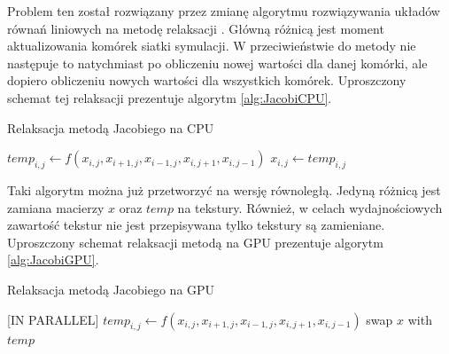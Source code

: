 Problem ten został rozwiązany przez zmianę algorytmu rozwiązywania układów
równań liniowych na metodę relaksacji . Główną różnicą jest moment
aktualizowania komórek siatki symulacji. W przeciwieństwie do metody  nie następuje to natychmiast po obliczeniu nowej wartości dla danej
komórki, ale dopiero obliczeniu nowych wartości dla wszystkich komórek.
Uproszczony schemat tej relaksacji prezentuje algorytm \ref{alg:JacobiCPU}.

\begin{algorithm}[H]
  \caption{Relaksacja metodą Jacobiego na CPU}
  \label{alg:JacobiCPU}
\begin{algorithmic}
    \State $temp_{i,j}\gets f(x_{i,j}, x_{i+1,j}, x_{i-1,j}, x_{i,j+1}, x_{i,j-1})$
  \EndFor
    \State $x_{i,j}\gets temp_{i,j}$
  \EndFor
\EndFor
\end{algorithmic}
\end{algorithm}

Taki algorytm można już przetworzyć na wersję równoległą. Jedyną różnicą jest
zamiana macierzy $x$ oraz $temp$ na tekstury. Również, w celach wydajnościowych
zawartość tekstur nie jest przepisywana tylko tekstury są zamieniane.
Uproszczony schemat relaksacji metodą  na GPU prezentuje algorytm
\ref{alg:JacobiGPU}.

\begin{algorithm}[H]
  \caption{Relaksacja metodą Jacobiego na GPU}
  \label{alg:JacobiGPU}
\begin{algorithmic}
   [IN PARALLEL]
    \State $temp_{i,j}\gets f(x_{i,j}, x_{i+1,j}, x_{i-1,j}, x_{i,j+1}, x_{i,j-1})$
  \EndFor
  \State swap $x$ with $temp$
\EndFor
\end{algorithmic}
\end{algorithm}

